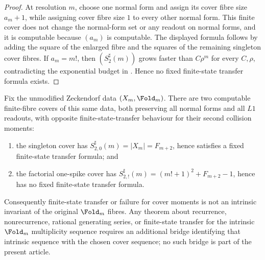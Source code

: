 \begin{proof}
At resolution \(m\), choose one normal form and assign its cover fibre size
\(a_m+1\), while assigning cover fibre size \(1\) to every other normal form.
This finite cover does not change the normal-form set or any readout on normal
forms, and it is computable because \((a_m)\) is computable.  The displayed
formula follows by adding the square of the enlarged fibre and the squares of
the remaining singleton cover fibres.  If \(a_m=m!\), then
\((S_2^\sharp(m))\) grows faster than
\(C\rho^m\) for every \(C,
\rho\), contradicting the exponential budget in
.  Hence no fixed finite-state
transfer formula exists.
\end{proof}

\begin{theorem}
\label{thm:L2-two-cover-intrinsic-boundary}
Fix the unmodified Zeckendorf data \((X_m,\Fold_m)\).  There are two computable
finite-fibre covers of this same data, both preserving all normal forms and all
\(L1\) readouts, with opposite finite-state-transfer behaviour for their second
collision moments:
\begin{enumerate}
\item the singleton cover has
  \(S_{2,0}^\sharp(m)=\lvert X_m\rvert=F_{m+2}\), hence satisfies a fixed
  finite-state transfer formula; and
\item the factorial one-spike cover has
  \(S_{2,!}^\sharp(m)=(m!+1)^2+F_{m+2}-1\), hence has no fixed finite-state
  transfer formula.
\end{enumerate}
Consequently finite-state transfer or failure for cover moments is not an
intrinsic invariant of the original \(\Fold_m\) fibres.  Any theorem about
recurrence, nonrecurrence, rational generating series, or finite-state transfer
for the intrinsic \(\Fold_m\) multiplicity sequence requires an additional bridge
identifying that intrinsic sequence with the chosen cover sequence; no such
bridge is part of the present article.
\end{theorem}

